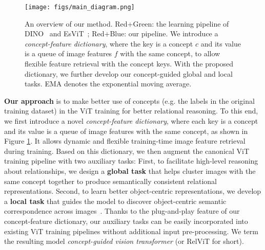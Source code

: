 \documentclass{article} \usepackage{iclr2022_conference,times}
\begin{document}
\begin{figure}[t!]
    \vskip -0.2in
    \centering
    \texttt{[image: figs/main\_diagram.png]}
    \vspace{-14pt}
    \caption{An overview of our method. \textcolor{myred}{Red}+\textcolor{mygreen}{Green}: the learning pipeline of DINO~\citep{dino} and EsViT~\citep{esvit}; \textcolor{myred}{Red}+\textcolor{myblue}{Blue}: our pipeline. We introduce a \emph{concept-feature dictionary}, where the key is a concept $c$ and its value is a queue of image features $f$ with the same concept, to allow flexible feature retrieval with the concept keys. With the proposed dictionary, we further develop our concept-guided global and local tasks. EMA denotes the exponential moving average.
    }
    \label{fig:main_diagram}
    \vspace{-16pt}
\end{figure}

\textbf{Our approach} is to make better use of concepts (e.g. the labels in the original training dataset) in the ViT training for better relational reasoning. To this end, we first introduce a novel \emph{concept-feature dictionary}, where each key is a concept and its value is a queue of image features with the same concept, as shown in Figure \ref{fig:main_diagram}. It allows dynamic and flexible training-time image feature retrieval during training. Based on this dictionary, we then augment the canonical ViT training pipeline with two auxiliary tasks: First, to facilitate high-level reasoning about relationships, we design a \textbf{global task} that helps cluster images with the same concept together to produce semantically consistent relational representations. Second, to learn better object-centric representations, we develop a \textbf{local task} that guides the model to discover object-centric semantic correspondence across images~\citep{liu2010sift}. Thanks to the plug-and-play feature of our concept-feature dictionary, our auxiliary tasks can be easily incorporated into existing ViT training pipelines without additional input pre-processing. We term the resulting model \emph{concept-guided vision transformer} (or RelViT for short).
\end{document}
